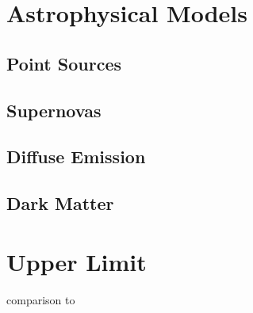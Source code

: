 \section{Astrophysical Models}

\subsection{Point Sources}

\subsection{Supernovas}

\subsection{Diffuse Emission}

\subsection{Dark Matter}

\section{Upper Limit}

comparison to 

